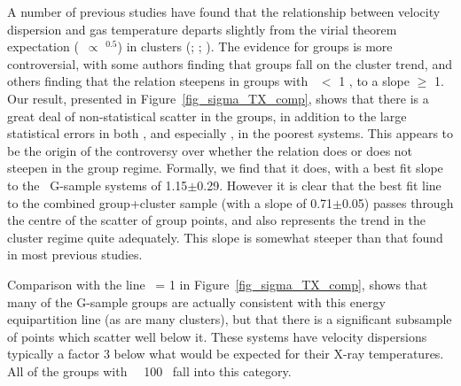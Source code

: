 \documentclass[usenatbib]{mn2e}
\begin{document}
A number of previous studies have found that the relationship between velocity
dispersion and gas temperature departs slightly from the virial theorem
expectation (\sigmav\ $\propto$ \TX$^{0.5}$) in clusters
(\citealt*{bird95}; \citealt{girardi98}; \citealt*{wu99}).  The evidence for
groups is more controversial, with some authors \citep[e.g.][]{xue00,mulchaey00}
finding that groups fall on the cluster trend, and others
\citep{helsdon00a,helsdon00b} finding that the relation steepens in groups with
\TX\ $<$ 1 \kev, to a slope $\ge$ 1.  Our result, presented in
Figure~\ref{fig_sigma_TX_comp}, shows that there is a great deal of
non-statistical scatter in the groups, in addition to the large statistical
errors in both \TX, and especially \sigmav, in the poorest systems.  This appears
to be the origin of the controversy over whether the relation does or does not
steepen in the group regime. Formally, we find that it does, with a best fit
slope to the \GEMS\ G-sample systems of 1.15$\pm$0.29.  However it is clear that
the best fit line to the combined group+cluster sample (with a slope of
0.71$\pm$0.05) passes through the centre of the scatter of group points, and also
represents the trend in the cluster regime quite adequately.  This slope is
somewhat steeper than that found in most previous studies. 

Comparison with the line \betaspec\ = 1 in Figure~\ref{fig_sigma_TX_comp}, shows
that many of the G-sample groups are actually consistent with this energy
equipartition line (as are many clusters), but that there is a significant
subsample of points which scatter well below it.  These systems have velocity
dispersions typically a factor 3 below what would be expected for their X-ray
temperatures. All of the groups with \sigmav\ \ltsim\ 100 \kmps\ fall into this
category.
\end{document}
